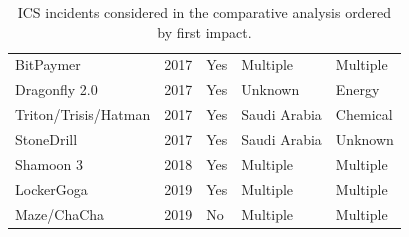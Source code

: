 \documentclass[runningheads]{llncs}
\begin{document}
\begin{table}[h]
\begin{tabular}{|l|l|l|l|l|}
    BitPaymer                       & 2017                                       & Yes                                    & Multiple                                     & Multiple                             \\
    Dragonfly 2.0                   & 2017                                       & Yes                                    & Unknown                                            & Energy                               \\
    Triton/Trisis/Hatman            & 2017                                       & Yes                                    & Saudi Arabia                                 & Chemical                  \\
    StoneDrill                      & 2017                                       & Yes                                    & Saudi Arabia                                 & Unknown                                    \\
    Shamoon 3                       & 2018                                       & Yes                                    & Multiple                                     & Multiple                             \\
    LockerGoga                      & 2019                                       & Yes                                    & Multiple                                     & Multiple                             \\
    Maze/ChaCha                     & 2019                                       & No                                     & Multiple                                     & Multiple\\
    \hline
    \end{tabular}
    \medskip\medskip
    \caption{ICS incidents considered in the comparative analysis ordered by first impact.}
    \end{table}
\end{document}

